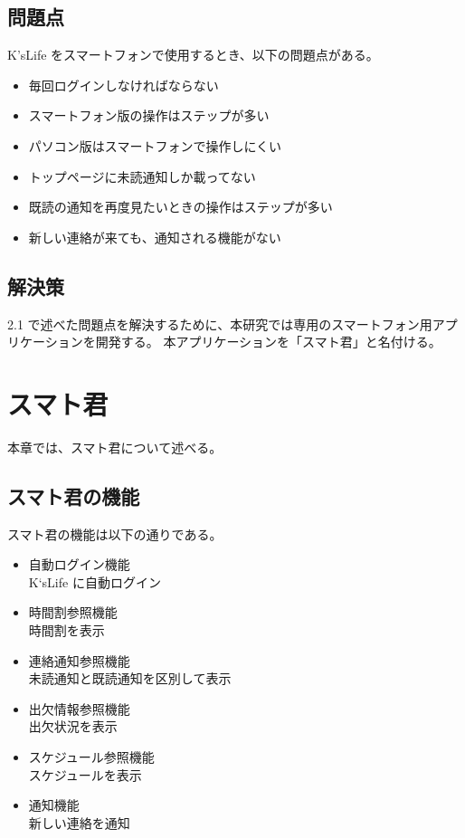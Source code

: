 \documentclass[a4j,12pt,onecolumn,oneside,titlepage,openany,final]{jreport}
\begin{document}
\section{問題点}\label{mondaiten}
K'sLife をスマートフォンで使用するとき、以下の問題点がある。
\begin{itemize}
\item 毎回ログインしなければならない
\item スマートフォン版の操作はステップが多い
\item パソコン版はスマートフォンで操作しにくい
\item トップページに未読通知しか載ってない
\item 既読の通知を再度見たいときの操作はステップが多い
\item 新しい連絡が来ても、通知される機能がない
 \end{itemize}

\section{解決策}\label{kaisaku}
 2.1 で述べた問題点を解決するために、本研究では専用のスマートフォン用アプリケーションを開発する。
 本アプリケーションを「スマト君」と名付ける。


\chapter{スマト君}\label{sumatokun}
本章では、スマト君について述べる。
\section{スマト君の機能}\label{kizon_gaiyou}
スマト君の機能は以下の通りである。
\begin{itemize}
\item 自動ログイン機能
\\K‘sLife に自動ログイン
\item 時間割参照機能
\\時間割を表示
\item 連絡通知参照機能
\\未読通知と既読通知を区別して表示
\item 出欠情報参照機能
\\出欠状況を表示
\item スケジュール参照機能
\\スケジュールを表示
\item 通知機能
\\新しい連絡を通知

\end{itemize}
\end{document}
